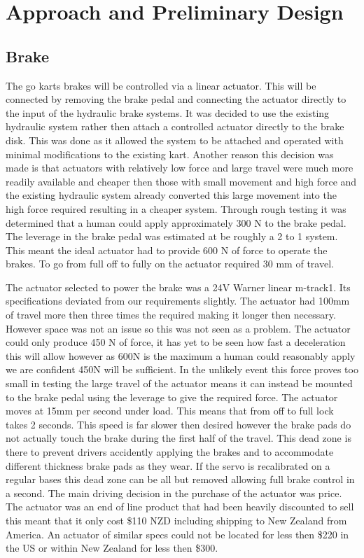 \chapter{Approach and Preliminary Design}

\section*{Brake}
The go karts brakes will be controlled via a linear actuator. This will be connected by removing the brake pedal and connecting the actuator directly to the input of the hydraulic brake systems. It was decided to use the existing hydraulic system rather then attach a controlled actuator directly to the brake disk. This was done as it allowed the system to be attached and operated with minimal modifications to the existing kart. Another reason this decision was made is that actuators with relatively low force and large travel were much more readily available and cheaper then those with small movement and high force and the existing hydraulic system already converted this large movement into the high force required resulting in a cheaper system. Through rough testing it was determined that a human could apply approximately 300 N to the brake pedal. The leverage in the brake pedal was estimated at be roughly a 2 to 1 system. This meant the ideal actuator had to provide 600 N of force to operate the brakes. To go from full off to fully on the actuator required 30 mm of travel.

The actuator selected to power the brake was a 24V Warner linear m-track1. Its specifications deviated from our requirements slightly. The actuator had 100mm of travel more then three times the required making it longer then necessary. However space was not an issue so this was not seen as a problem. The actuator could only produce 450 N of force, it has yet to be seen how fast a deceleration this will allow however as 600N is the maximum a human could reasonably apply we are confident 450N will be sufficient. In the unlikely event this force proves too small in testing the large travel of the actuator means it can instead be mounted to the brake pedal using the leverage to give the required force. The actuator moves at 15mm per second under load. This means that from off to full lock takes 2 seconds. This speed is far slower then desired however the brake pads do not actually touch the brake during the first half of the travel. This dead zone is there to prevent drivers accidently applying the brakes and to accommodate different thickness brake pads as they wear. If the servo is recalibrated on a regular bases this dead zone can be all but removed allowing full brake control in a second. The main driving decision in the purchase of the actuator was price. The actuator was an end of line product that had been heavily discounted to sell this meant that it only cost \$110 NZD including shipping to New Zealand from America. An actuator of similar specs could not be located for less then \$220 in the US or within New Zealand for less then \$300.

